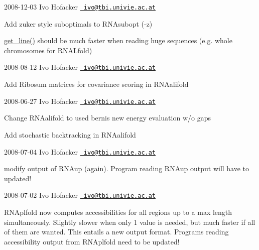 2008-\/12-\/03 Ivo Hofacker \href{mailto:ivo@tbi.univie.ac.at}{\texttt{ ivo@tbi.\+univie.\+ac.\+at}}


\begin{DoxyItemize}
\item Add zuker style suboptimals to R\+N\+Asubopt (-\/z)
\item \mbox{\hyperlink{utils_2basic_8h_abe51806d14cff0789a8c1df7dbc45b71}{get\+\_\+line()}} should be much faster when reading huge sequences (e.\+g. whole chromosomes for R\+N\+A\+Lfold)
\end{DoxyItemize}

2008-\/08-\/12 Ivo Hofacker \href{mailto:ivo@tbi.univie.ac.at}{\texttt{ ivo@tbi.\+univie.\+ac.\+at}}


\begin{DoxyItemize}
\item Add Ribosum matrices for covariance scoring in R\+N\+Aalifold
\end{DoxyItemize}

2008-\/06-\/27 Ivo Hofacker \href{mailto:ivo@tbi.univie.ac.at}{\texttt{ ivo@tbi.\+univie.\+ac.\+at}}


\begin{DoxyItemize}
\item Change R\+N\+Aalifold to used berni\textquotesingle{}s new energy evaluation w/o gaps
\item Add stochastic backtracking in R\+N\+Aalifold
\end{DoxyItemize}

2008-\/07-\/04 Ivo Hofacker \href{mailto:ivo@tbi.univie.ac.at}{\texttt{ ivo@tbi.\+univie.\+ac.\+at}}


\begin{DoxyItemize}
\item modify output of R\+N\+Aup (again). Program reading R\+N\+Aup output will have to updated!
\end{DoxyItemize}

2008-\/07-\/02 Ivo Hofacker \href{mailto:ivo@tbi.univie.ac.at}{\texttt{ ivo@tbi.\+univie.\+ac.\+at}}


\begin{DoxyItemize}
\item R\+N\+Aplfold now computes accessibilities for all regions up to a max length simultaneously. Slightly slower when only 1 value is needed, but much faster if all of them are wanted. This entails a new output format. Programs reading accessibility output from R\+N\+Aplfold need to be updated!
\end{DoxyItemize}


